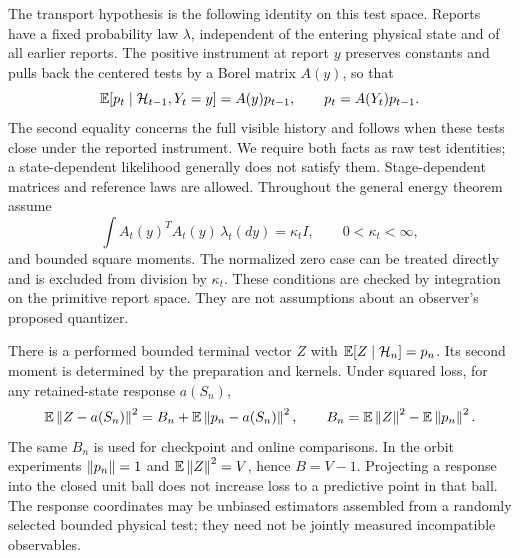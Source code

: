 The transport hypothesis is the following identity on this test space. Reports have a fixed probability law $\lambda$, independent of the entering physical state and of all earlier reports. The positive instrument at report $y$ preserves constants and pulls back the centered tests by a Borel matrix $A(y)$, so that
\begin{equation}\label{eq:raw-pullback}
 \mathbb E[p_t\mid\mathcal H_{t-1},Y_t=y]=A(y)p_{t-1},
 \qquad p_t=A(Y_t)p_{t-1}.
\end{equation}
The second equality concerns the full visible history and follows when these tests close under the reported instrument. We require both facts as raw test identities; a state-dependent likelihood generally does not satisfy them. Stage-dependent matrices and reference laws are allowed. Throughout the general energy theorem assume
\begin{equation}\label{eq:second-isotropy}
 \int A_t(y)^TA_t(y)\,\lambda_t(dy)=\kappa_t I,
 \qquad 0<\kappa_t<\infty,
\end{equation}
and bounded square moments. The normalized zero case can be treated directly and is excluded from division by $\kappa_t$. These conditions are checked by integration on the primitive report space. They are not assumptions about an observer's proposed quantizer.

There is a performed bounded terminal vector $Z$ with $\mathbb E[Z\mid\mathcal H_n]=p_n$. Its second moment is determined by the preparation and kernels. Under squared loss, for any retained-state response $a(S_n)$,
\begin{equation}\label{eq:projection-task}
 \mathbb E\left\lVert Z-a(S_n)\right\rVert^2
 =B_n+\mathbb E\left\lVert p_n-a(S_n)\right\rVert^2,
 \qquad B_n=\mathbb E\left\lVert Z\right\rVert^2-\mathbb E\left\lVert p_n\right\rVert^2.
\end{equation}
The same $B_n$ is used for checkpoint and online comparisons. In the orbit experiments $\left\lVert p_n\right\rVert=1$ and $\mathbb E\left\lVert Z\right\rVert^2=V$, hence $B=V-1$. Projecting a response into the closed unit ball does not increase loss to a predictive point in that ball. The response coordinates may be unbiased estimators assembled from a randomly selected bounded physical test; they need not be jointly measured incompatible observables.


